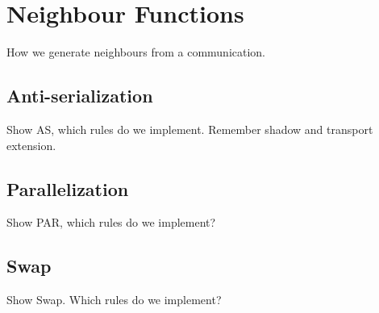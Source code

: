 \section{Neighbour Functions}
How we generate neighbours from a communication.

\subsection{Anti-serialization}
Show AS, which rules do we implement. Remember shadow and transport extension.

\subsection{Parallelization}
Show PAR, which rules do we implement?

\subsection{Swap}
Show Swap. Which rules do we implement?
